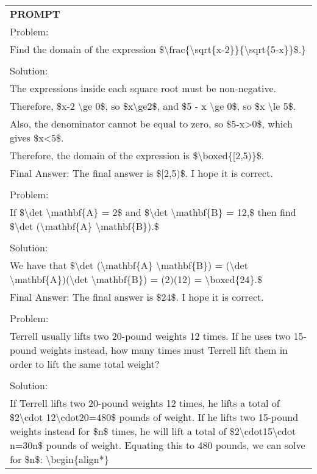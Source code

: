 \begin{table}[ht]
    \centering \small
\begin{tabular}{p{12cm}}
\toprule
\textbf{PROMPT}\\
Problem:
\\Find the domain of the expression \$\textbackslash frac\{\textbackslash sqrt\{x-2\}\}\{\textbackslash sqrt\{5-x\}\}\$.\}
\\
\\Solution:
\\The expressions inside each square root must be non-negative.
\\Therefore, \$x-2 \textbackslash ge 0\$, so \$x\textbackslash ge2\$, and \$5 - x \textbackslash ge 0\$, so \$x \textbackslash le 5\$.
\\Also, the denominator cannot be equal to zero, so \$5-x>0\$, which gives \$x<5\$.
\\Therefore, the domain of the expression is \$\textbackslash boxed\{[2,5)\}\$.
\\Final Answer: The final answer is \$[2,5)\$. I hope it is correct.
\\
\\Problem:
\\If \$\textbackslash det \textbackslash mathbf\{A\} = 2\$ and \$\textbackslash det \textbackslash mathbf\{B\} = 12,\$ then find \$\textbackslash det (\textbackslash mathbf\{A\} \textbackslash mathbf\{B\}).\$
\\
\\Solution:
\\We have that \$\textbackslash det (\textbackslash mathbf\{A\} \textbackslash mathbf\{B\}) = (\textbackslash det \textbackslash mathbf\{A\})(\textbackslash det \textbackslash mathbf\{B\}) = (2)(12) = \textbackslash boxed\{24\}.\$
\\Final Answer: The final answer is \$24\$. I hope it is correct.
\\
\\Problem:
\\Terrell usually lifts two 20-pound weights 12 times. If he uses two 15-pound weights instead, how many times must Terrell lift them in order to lift the same total weight?
\\
\\Solution:
\\If Terrell lifts two 20-pound weights 12 times, he lifts a total of \$2\textbackslash cdot 12\textbackslash cdot20=480\$ pounds of weight.  If he lifts two 15-pound weights instead for \$n\$ times, he will lift a total of \$2\textbackslash cdot15\textbackslash cdot n=30n\$ pounds of weight.  Equating this to 480 pounds, we can solve for \$n\$: \textbackslash begin\{align*\}

\end{tabular}
\end{table}
